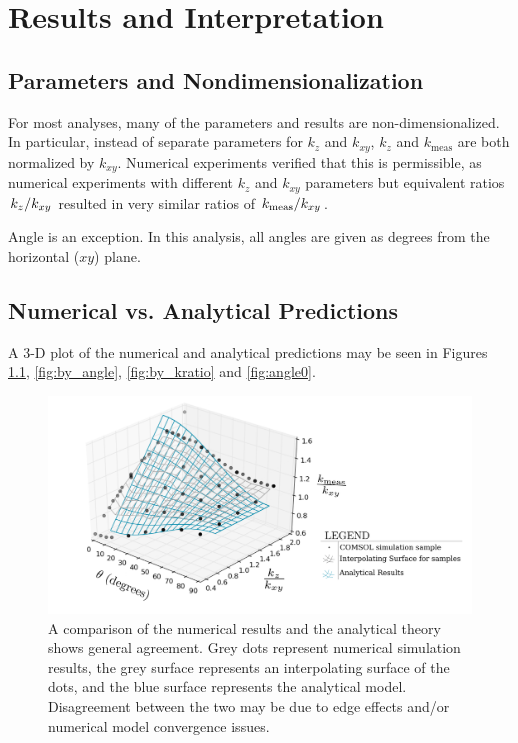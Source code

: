 \chapter{Results and Interpretation}

\section{Parameters and Nondimensionalization}

For most analyses, many of the parameters and results are non-dimensionalized. In
particular, instead of separate parameters for \(k_z\) and \(k_{xy}\), \(k_z\)
and \(k_{\textrm{meas}}\) are both normalized by \(k_{xy}\). Numerical
experiments verified that this is permissible, as numerical experiments with
different \(k_z\) and \(k_{xy}\) parameters but equivalent ratios
\(\left.{k_z}\middle/{k_{xy}}\right.\) resulted in very similar ratios of
\(\left.{k_{\textrm{meas}}}\middle/{k_{xy}}\right.\).

Angle is an exception. In this analysis, all angles are given as degrees from
the horizontal (\(xy\)) plane.

\section{Numerical vs. Analytical Predictions}

A 3-D plot of the numerical and analytical predictions may be seen in 
Figures \ref{fig:numvanal}, \ref{fig:by_angle}, \ref{fig:by_kratio} and \ref{fig:angle0}.

\begin{figure}[h]
\centering
\includegraphics[width=\textwidth]{fig/numvanal.png}
\caption{A comparison of the numerical results and the analytical theory shows
general agreement. Grey dots represent numerical simulation results, the grey surface represents an interpolating surface of the dots, and the blue surface represents the analytical model. Disagreement between the two may be due to edge effects and/or numerical
model convergence issues.}
\label{fig:numvanal}
\end{figure}

